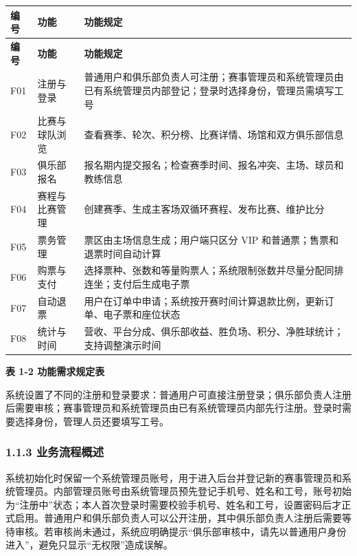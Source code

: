 \documentclass[UTF8,zihao=-4,a4paper]{ctexart}
\newcommand{\tablecaptionline}[1]{\vspace{-1.6em}\begin{center}\small\bfseries #1\end{center}\vspace{0.2em}}
\begin{document}
\begin{center}
\small
\begin{longtable}{>{\raggedright\arraybackslash}p{} >{\raggedright\arraybackslash}p{} >{\raggedright\arraybackslash}p{}}
\toprule
\rowcolor{tablehead}
\textbf{编号} & \textbf{功能} & \textbf{功能规定} \\
\midrule
\endfirsthead
\toprule
\rowcolor{tablehead}
\textbf{编号} & \textbf{功能} & \textbf{功能规定} \\
\midrule
\endhead
F01 & 注册与登录 & 普通用户和俱乐部负责人可注册；赛事管理员和系统管理员由已有系统管理员内部登记；登录时选择身份，管理员需填写工号 \\
\midrule
F02 & 比赛与球队浏览 & 查看赛季、轮次、积分榜、比赛详情、场馆和双方俱乐部信息 \\
\midrule
F03 & 俱乐部报名 & 报名期内提交报名；检查赛季时间、报名冲突、主场、球员和教练信息 \\
\midrule
F04 & 赛程与比赛管理 & 创建赛季、生成主客场双循环赛程、发布比赛、维护比分 \\
\midrule
F05 & 票务管理 & 票区由主场信息生成；用户端只区分 VIP 和普通票；售票和退票时间自动计算 \\
\midrule
F06 & 购票与支付 & 选择票种、张数和等量购票人；系统限制张数并尽量分配同排连坐；支付后生成电子票 \\
\midrule
F07 & 自动退票 & 用户在订单中申请；系统按开赛时间计算退款比例，更新订单、电子票和座位状态 \\
\midrule
F08 & 统计与时间 & 营收、平台分成、俱乐部收益、胜负场、积分、净胜球统计；支持调整演示时间 \\
\midrule
\bottomrule
\end{longtable}
\end{center}

\tablecaptionline{表 1-2 功能需求规定表}

系统设置了不同的注册和登录要求：普通用户可直接注册登录；俱乐部负责人注册后需要审核；赛事管理员和系统管理员由已有系统管理员内部先行注册。登录时需要选择身份，管理人员还要填写工号。

\subsubsection*{1.1.3 业务流程概述}
{}

系统初始化时保留一个系统管理员账号，用于进入后台并登记新的赛事管理员和系统管理员。内部管理员账号由系统管理员预先登记手机号、姓名和工号，账号初始为“注册中”状态；本人首次登录时需要校验手机号、姓名和工号，设置密码后才正式启用。普通用户和俱乐部负责人可以公开注册，其中俱乐部负责人注册后需要等待审核。若审核尚未通过，系统应明确提示“俱乐部审核中，请先以普通用户身份进入”，避免只显示“无权限”造成误解。
\end{document}
